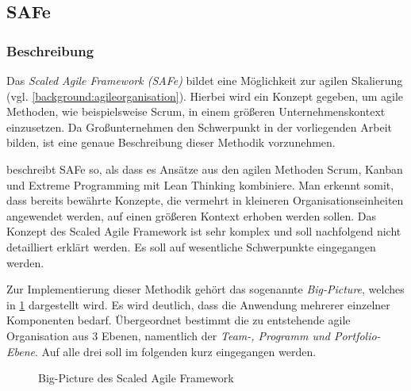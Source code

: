 \todots

\subsection{SAFe}

\subsubsection{Beschreibung}

Das \textit{Scaled Agile Framework (SAFe)} bildet eine Möglichkeit zur agilen Skalierung (vgl. \ref{background:agileorganisation}). Hierbei wird ein Konzept gegeben, um agile Methoden, wie beispielsweise Scrum, in einem größeren Unternehmenskontext einzusetzen. Da Großunternehmen den Schwerpunkt in der vorliegenden Arbeit bilden, ist eine genaue Beschreibung dieser Methodik vorzunehmen.

 beschreibt SAFe so, als dass es Ansätze aus den agilen Methoden Scrum, Kanban und Extreme Programming mit Lean Thinking kombiniere. Man erkennt somit, dass bereits bewährte  Konzepte, die vermehrt in kleineren Organisationseinheiten angewendet werden, auf einen größeren Kontext erhoben werden sollen. Das Konzept des Scaled Agile Framework ist sehr komplex und soll nachfolgend nicht detailliert erklärt werden. Es soll auf wesentliche Schwerpunkte eingegangen werden. 

Zur Implementierung dieser Methodik gehört das sogenannte \textit{Big-Picture}, welches in \ref{fig:safe} dargestellt wird. Es wird deutlich, dass die Anwendung mehrerer einzelner Komponenten bedarf. Übergeordnet bestimmt die zu entstehende agile Organisation aus 3 Ebenen, namentlich der \textit{Team-, Programm und Portfolio-Ebene}. Auf alle drei soll im folgenden kurz eingegangen werden.

\begin{figure}[H]
	\centering
	\caption[Big-Picture des Scaled Agile Framework]{Big-Picture des Scaled Agile Framework \protect \cite[S. 4]{turetken_assessing_2017}}
	\label{fig:safe}
\end{figure}

